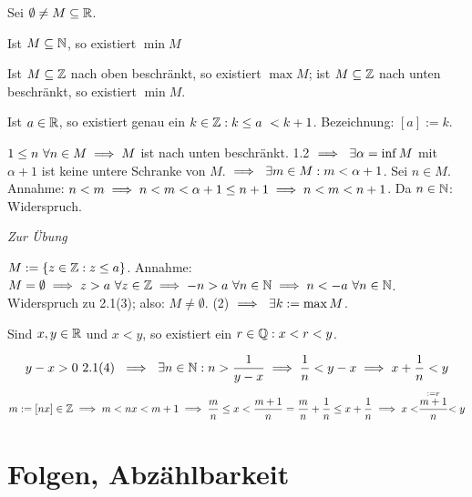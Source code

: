 \documentclass[a4paper,oneside,DIV15,BCOR12mm]{scrbook}
\begin{document}
\begin{satz}
Sei $\emptyset \ne M \subseteq \mathbb{R}$.

\begin{liste}
\item Ist $M \subseteq \mathbb{N}$, so existiert $\min{M}$
\item Ist $M \subseteq \mathbb{Z}$ nach oben beschränkt, so existiert $\max{M}$; ist $M \subseteq \mathbb{Z}$ nach unten beschränkt, so existiert $\min{M}$.
\item Ist $a \in \mathbb{R}$, so existiert genau ein $k \in \mathbb{Z}: k \le a \ < k+1$. Bezeichnung: $[a] := k$.
\end{liste}
\end{satz}

\begin{beweise}
\item $ 1 \le n \ \forall n \in M \implies M $ ist nach unten beschränkt. 1.2 $\folgt \ \exists \alpha = \inf{M}$ mit $\alpha + 1 $ ist keine untere Schranke von $M$. $\implies \ \exists m \in M: m < \alpha + 1$. Sei $n \in M$. Annahme: $n < m \implies n <  m < \alpha +1 \le n +1 \implies n < m < n+1$. Da $n \in \mathbb{N}$: Widerspruch.
\item \textit{Zur Übung}
\item $M := \{ z \in \mathbb{Z}: z \le a \}$. Annahme: $M = \emptyset\folgt z > a \ \forall z \in \MdZ \folgt -n > a \ \forall n \in \MdN \folgt n < -a \ \forall n \in \MdN$. Widerspruch zu 2.1(3); also: $M \ne \emptyset$. (2) $\implies \ \exists k := \max{M}$.
\end{beweise}

\begin{satz}
Sind $x,y \in \mathbb{R}$ und $x<y$, so existiert ein $r \in \mathbb{Q}: x < r < y$.
\end{satz}

\begin{beweis}
$$ y-x > 0 \mbox{ 2.1(4) } \folgt \ \exists n \in \MdN: n > \frac{1}{y-x} \folgt \frac{1}{n} < y-x \folgt x + \frac{1}{n} < y $$
$$ m := [nx] \in \mathbb{Z} \implies m < nx < m+1 \implies \frac{m}{n} \le x < \frac{m+1}{n} = \frac{m}{n} + \frac{1}{n} \le x + \frac{1}{n} \implies x < \stackrel{:= r }{\frac{m+1}{n}} < y$$
\end{beweis}

\chapter{Folgen, Abzählbarkeit}
\end{document}
